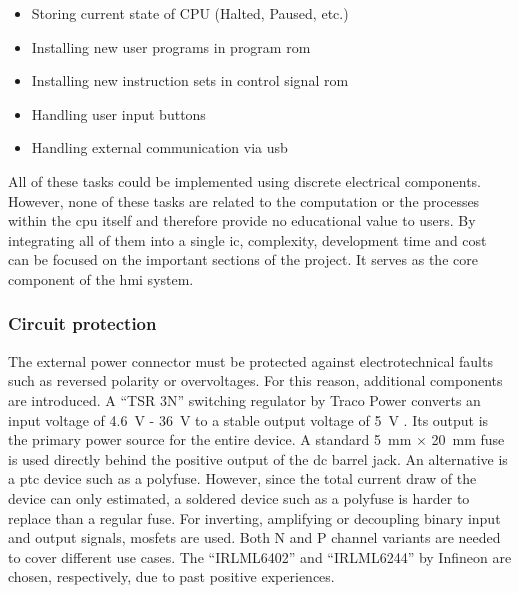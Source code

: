 \begin{itemize}
    \item Storing current state of CPU (Halted, Paused, etc.)
    \item Installing new user programs in program \ac{rom}
    \item Installing new instruction sets in control signal \ac{rom}
    \item Handling user input buttons
    \item Handling external communication via \ac{usb}
\end{itemize}

All of these tasks could be implemented using discrete electrical components. However, none of these tasks are related to the computation or the processes within the \ac{cpu} itself and therefore provide no educational value to users. By integrating all of them into a single \ac{ic}, complexity, development time and cost can be focused on the important sections of the project. It serves as the core component of the \ac{hmi} system.

\subsubsection*{Circuit protection}

The external power connector must be protected against electrotechnical faults such as reversed polarity or overvoltages. For this reason, additional components are introduced. A ``TSR 3N'' switching regulator by Traco Power converts an input voltage of \SI{4.6}{\volt} - \SI{36}{\volt} to a stable output voltage of \SI{5}{\volt} \cite{tracopower_tsr3}. Its output is the primary power source for the entire device. A standard \SI{5}{\milli\meter} $\times$ \SI{20}{\milli\meter} fuse is used directly behind the positive output of the \ac{dc} barrel jack. An alternative is a \ac{ptc} device such as a polyfuse. However, since the total current draw of the device can only estimated, a soldered device such as a polyfuse is harder to replace than a regular fuse. For inverting, amplifying or decoupling binary input and output signals, \acp{mosfet} are used. Both N and P channel variants are needed to cover different use cases. The ``IRLML6402'' and ``IRLML6244'' by Infineon are chosen, respectively, due to past positive experiences.

